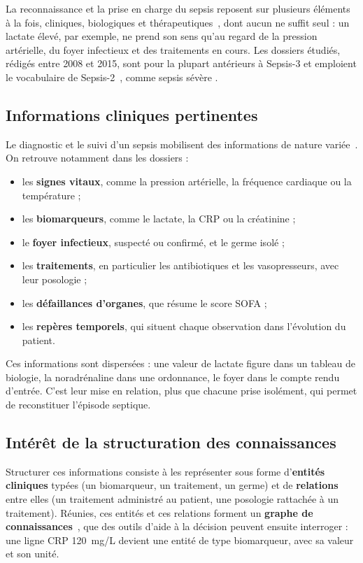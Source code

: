 La reconnaissance et la prise en charge du sepsis reposent sur plusieurs éléments à la fois, cliniques, biologiques et thérapeutiques~\cite{evans2021ssc}, dont aucun ne suffit seul : un lactate élevé, par exemple, ne prend son sens qu'au regard de la pression artérielle, du foyer infectieux et des traitements en cours. Les dossiers étudiés, rédigés entre 2008 et 2015, sont pour la plupart antérieurs à Sepsis-3 et emploient le vocabulaire de Sepsis-2~\cite{levy2003sccm}, comme \og sepsis sévère \fg{}.

\subsection{Informations cliniques pertinentes}

Le diagnostic et le suivi d'un sepsis mobilisent des informations de nature variée~\cite{singer2016third,evans2021ssc}. On retrouve notamment dans les dossiers :
\begin{itemize}
    \item les \textbf{signes vitaux}, comme la pression artérielle, la fréquence cardiaque ou la température ;
    \item les \textbf{biomarqueurs}, comme le lactate, la CRP ou la créatinine ;
    \item le \textbf{foyer infectieux}, suspecté ou confirmé, et le germe isolé ;
    \item les \textbf{traitements}, en particulier les antibiotiques et les vasopresseurs, avec leur posologie ;
    \item les \textbf{défaillances d'organes}, que résume le score SOFA ;
    \item les \textbf{repères temporels}, qui situent chaque observation dans l'évolution du patient.
\end{itemize}
Ces informations sont dispersées : une valeur de lactate figure dans un tableau de biologie, la noradrénaline dans une ordonnance, le foyer dans le compte rendu d'entrée. C'est leur mise en relation, plus que chacune prise isolément, qui permet de reconstituer l'épisode septique.

\subsection{Intérêt de la structuration des connaissances}

Structurer ces informations consiste à les représenter sous forme d'\textbf{entités cliniques} typées (un biomarqueur, un traitement, un germe) et de \textbf{relations} entre elles (un traitement administré au patient, une posologie rattachée à un traitement). Réunies, ces entités et ces relations forment un \textbf{graphe de connaissances}~\cite{hogan2021knowledge}, que des outils d'aide à la décision peuvent ensuite interroger : une ligne \og CRP 120~mg/L \fg{} devient une entité de type biomarqueur, avec sa valeur et son unité.

